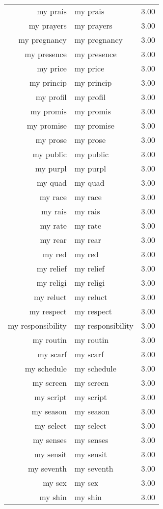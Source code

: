 \begin{table}[ht]
\begin{tabular}{rlr}
  my prais & my prais & 3.00 \\ 
  my prayers & my prayers & 3.00 \\ 
  my pregnancy & my pregnancy & 3.00 \\ 
  my presence & my presence & 3.00 \\ 
  my price & my price & 3.00 \\ 
  my princip & my princip & 3.00 \\ 
  my profil & my profil & 3.00 \\ 
  my promis & my promis & 3.00 \\ 
  my promise & my promise & 3.00 \\ 
  my prose & my prose & 3.00 \\ 
  my public & my public & 3.00 \\ 
  my purpl & my purpl & 3.00 \\ 
  my quad & my quad & 3.00 \\ 
  my race & my race & 3.00 \\ 
  my rais & my rais & 3.00 \\ 
  my rate & my rate & 3.00 \\ 
  my rear & my rear & 3.00 \\ 
  my red & my red & 3.00 \\ 
  my relief & my relief & 3.00 \\ 
  my religi & my religi & 3.00 \\ 
  my reluct & my reluct & 3.00 \\ 
  my respect & my respect & 3.00 \\ 
  my responsibility & my responsibility & 3.00 \\ 
  my routin & my routin & 3.00 \\ 
  my scarf & my scarf & 3.00 \\ 
  my schedule & my schedule & 3.00 \\ 
  my screen & my screen & 3.00 \\ 
  my script & my script & 3.00 \\ 
  my season & my season & 3.00 \\ 
  my select & my select & 3.00 \\ 
  my senses & my senses & 3.00 \\ 
  my sensit & my sensit & 3.00 \\ 
  my seventh & my seventh & 3.00 \\ 
  my sex & my sex & 3.00 \\ 
  my shin & my shin & 3.00 \\ 

\end{tabular}
\end{table}
